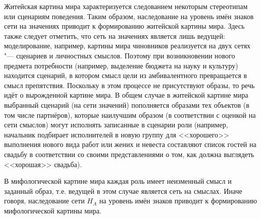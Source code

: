 Житейская картина мира характеризуется следованием некоторым стереотипам или сценариям поведения. Таким образом, наследование на уровень имён знаков сети на значениях приводит к формированию житейской картины мира. Здесь также следует отметить, что сеть на значениях является лишь ведущей: моделирование, например, картины мира чиновников реализуется на двух сетях "--- сценариев и личностных смыслов. Поэтому при возникновении нового предмета потребности (например, выделение бюджета на науку и культуру) находится сценарий, в котором смысл цели из амбивалентного превращается в смысл препятствия. Поскольку в этом процессе не присутствуют образы, то речь идёт о вырожденной картине мира. В общем случае в житейской картине мира выбранный сценарий (на сети значений) пополняется образами тех объектов (в том числе партнёров), которые наилучшим образом (в соответствии с оценкой на сети смыслов) могут исполнять записанные в сценарии роли (например, начальник подбирает исполнителей в новую группу для <<хорошего>> выполнения нового вида работ или жених и невеста составляют список гостей на свадьбу в соответствии со своими представлениями о том, как должна выглядеть <<хорошая>> свадьба).

В мифологической картине мира каждая роль имеет неизменный смысл и заданный образ, т.е. ведущей в этом случае является сеть на смыслах. Иначе говоря, наследование сети $H_A$ на уровень имён знаков приводит к формированию мифологической картины мира.

